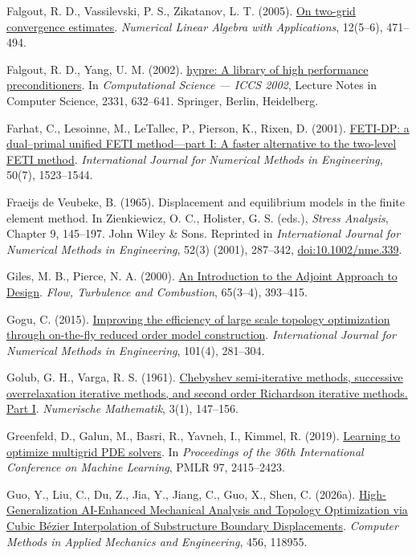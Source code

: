 \documentclass[preprint,12pt,authoryear]{elsarticle}
\begin{document}
Falgout, R. D., Vassilevski, P. S., Zikatanov, L. T. (2005). \href{https://doi.org/10.1002/nla.437}{On two-grid convergence estimates}. \emph{Numerical Linear Algebra with Applications}, 12(5--6), 471--494.

Falgout, R. D., Yang, U. M. (2002). \href{https://doi.org/10.1007/3-540-47789-6_66}{hypre: A library of high performance preconditioners}. In \emph{Computational Science --- ICCS 2002}, Lecture Notes in Computer Science, 2331, 632--641. Springer, Berlin, Heidelberg.

Farhat, C., Lesoinne, M., LeTallec, P., Pierson, K., Rixen, D. (2001). \href{https://doi.org/10.1002/nme.76}{FETI-DP: a dual--primal unified FETI method---part I: A faster alternative to the two-level FETI method}. \emph{International Journal for Numerical Methods in Engineering}, 50(7), 1523--1544.

Fraeijs de Veubeke, B. (1965). Displacement and equilibrium models in the finite element method. In Zienkiewicz, O. C., Holister, G. S. (eds.), \emph{Stress Analysis}, Chapter 9, 145--197. John Wiley \& Sons. Reprinted in \emph{International Journal for Numerical Methods in Engineering}, 52(3) (2001), 287--342, \href{https://doi.org/10.1002/nme.339}{doi:10.1002/nme.339}.

Giles, M. B., Pierce, N. A. (2000). \href{https://doi.org/10.1023/a:1011430410075}{An Introduction to the Adjoint Approach to Design}. \emph{Flow, Turbulence and Combustion}, 65(3--4), 393--415.

Gogu, C. (2015). \href{https://doi.org/10.1002/nme.4797}{Improving the efficiency of large scale topology optimization through on-the-fly reduced order model construction}. \emph{International Journal for Numerical Methods in Engineering}, 101(4), 281--304.

Golub, G. H., Varga, R. S. (1961). \href{https://doi.org/10.1007/BF01386013}{Chebyshev semi-iterative methods, successive overrelaxation iterative methods, and second order Richardson iterative methods. Part I}. \emph{Numerische Mathematik}, 3(1), 147--156.

Greenfeld, D., Galun, M., Basri, R., Yavneh, I., Kimmel, R. (2019). \href{https://proceedings.mlr.press/v97/greenfeld19a.html}{Learning to optimize multigrid PDE solvers}. In \emph{Proceedings of the 36th International Conference on Machine Learning}, PMLR 97, 2415--2423.

Guo, Y., Liu, C., Du, Z., Jia, Y., Jiang, C., Guo, X., Shen, C. (2026a). \href{https://doi.org/10.1016/j.cma.2026.118955}{High-Generalization AI-Enhanced Mechanical Analysis and Topology Optimization via Cubic Bézier Interpolation of Substructure Boundary Displacements}. \emph{Computer Methods in Applied Mechanics and Engineering}, 456, 118955.
\end{document}
